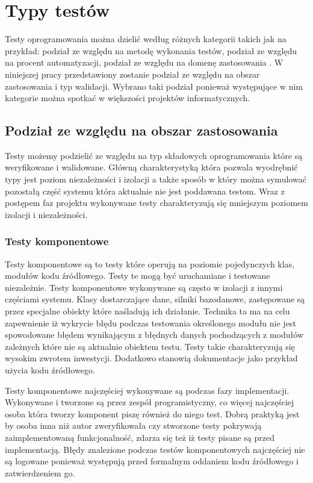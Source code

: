 \section{Typy testów}
Testy oprogramowania można dzielić według różnych kategorii takich jak na przykład: podział ze względu na metodę wykonania testów, podział ze względu na procent automatyzacji, podział ze względu na domenę zastosowania . W niniejszej pracy przedstawiony zostanie podział ze względu na obszar zastosowania i typ walidacji. Wybrano taki podział ponieważ występujące w nim kategorie można spotkać w większości projektów informatycznych.
 
\subsection{Podział ze względu na obszar zastosowania}
Testy możemy podzielić ze względu na typ składowych oprogramowania które są weryfikowane i walidowane. Główną charakterystyką która pozwala wyodrębnić typy jest poziom niezależności i izolacji a także sposób w który można symulować pozostałą część systemu która aktualnie nie jest poddawana testom. Wraz z postępem faz projektu wykonywane testy charakteryzują się mniejszym poziomem izolacji i niezależności. 


\subsubsection{Testy komponentowe}
Testy komponentowe są to testy które operują na poziomie pojedynczych klas, modułów kodu źródłowego. Testy te mogą być uruchamiane i testowane niezależnie. Testy komponentowe wykonywane są często w izolacji z innymi częściami systemu. Klasy dostarczające dane, silniki bazodanowe, zastępowane są przez specjalne obiekty które naśladują ich działanie. Technika ta ma na celu zapewnienie iż wykrycie błędu podczas testowania określonego modułu nie jest spowodowane błędem wynikającym z błędnych danych pochodzących z modułów zależnych które nie są aktualnie obiektem testu. Testy takie charakteryzują się wysokim zwrotem inwestycji. Dodatkowo stanowią dokumentacje jako przykład użycia kodu źródłowego.

Testy komponentowe najczęściej wykonywane są podczas fazy implementacji. Wykonywane i tworzone są przez zespół programistyczny, co więcej najczęściej osoba która tworzy komponent piszę również do niego test. Dobrą praktyką jest by osoba inna niż autor zweryfikowała czy stworzone testy pokrywają zaimplementowaną funkcjonalność, zdarza się też iż testy pisane są przed implementacją. Błędy znalezione podczas testów komponentowych najczęściej nie są logowane ponieważ występują przed formalnym oddaniem kodu źródłowego i zatwierdzeniem go.

